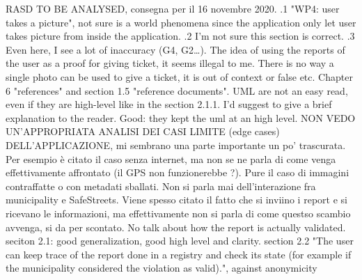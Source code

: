 RASD TO BE ANALYSED, consegna per il 16 novembre 2020.\newline
{}.1 "WP4: user takes a picture", not sure is a world phenomena since the application only let user takes picture from inside the application.\newline
{}.2 I'm not sure this section is correct.\newline
{}.3 Even here, I see a lot of inaccuracy (G4, G2\dots). The idea of using the reports of the user as a proof for giving ticket, it seems illegal to me. There is no way a single photo can be used to give a ticket, it is out of context or false etc.\newline
\newline
Chapter 6 "references" and section 1.5 "reference documents".\newline
\newline
UML are not an easy read, even if they are high-level like in the section 2.1.1. I'd suggest to give a brief explanation to the reader. Good: they kept the uml at an high level.\newline
\newline
NON VEDO UN'APPROPRIATA ANALISI DEI CASI LIMITE (edge cases) DELL'APPLICAZIONE, mi sembrano una parte importante un po' trascurata. Per esempio è citato il caso senza internet, ma non se ne parla di come venga effettivamente affrontato (il GPS non funzionerebbe ?). Pure il caso di immagini contraffatte o con metadati sballati. \newline
 \newline
Non si parla mai dell'interazione fra municipality e SafeStreets. Viene spesso citato il fatto che si inviino i report e si ricevano le informazioni, ma effettivamente non si parla di come questso scambio avvenga, si da per scontato.\newline
\newline
No talk about how the report is actually validated.
\newline
\newline
seciton 2.1: good generalization, good high level and clarity.
\newline
\newline
section 2.2 "The user can keep trace of the report done in a registry and check its state (for example if the municipality
considered the violation as valid).", against anonymicity \newline

